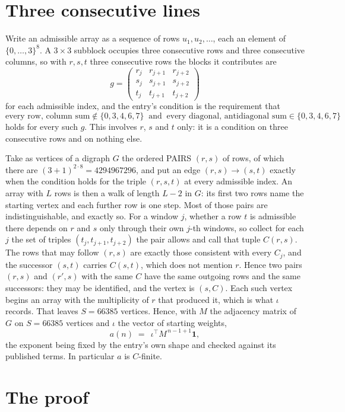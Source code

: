 \documentclass[11pt,a4paper]{article}
\theoremstyle{plain}
\theoremstyle{definition}
\begin{document}
\section{Three consecutive lines}

Write an admissible array as a sequence of rows $u_1,u_2,\dots$, each an element of
$\{0,\dots,3\}^{8}$. A $3\times3$ subblock occupies three consecutive rows and
three consecutive columns, so with $r,s,t$ three consecutive rows the blocks it
contributes are
\[
g=\begin{pmatrix}r_j&r_{j+1}&r_{j+2}\\ s_j&s_{j+1}&s_{j+2}\\ t_j&t_{j+1}&t_{j+2}\end{pmatrix}
\]
for each admissible index, and the entry's condition is the requirement that
\[
\text{every row, column sum} \notin \{0,3,4,6,7\}\ \text{ and }\ \text{every diagonal, antidiagonal sum} \in \{0,3,4,6,7\}
\]
holds for every such $g$. This involves $r$, $s$ and $t$ only: it is a condition on
three consecutive rows and on nothing else.

Take as vertices of a digraph $G$ the ordered PAIRS $(r,s)$ of rows, of which there are
$(3+1)^{2\cdot8}=4294967296$, and put an edge $(r,s)\to(s,t)$ exactly when the condition
holds for the triple $(r,s,t)$ at every admissible index. An array with $L$ rows is then a
walk of length $L-2$ in $G$: its first two rows name the starting vertex and each further
row is one step. Most of those pairs are indistinguishable, and exactly so. For a window $j$, whether a row $t$ is admissible there depends on $r$ and $s$ only through their own $j$-th windows, so collect for each $j$ the set of triples $(t_j,t_{j+1},t_{j+2})$ the pair allows and call that tuple $C(r,s)$. The rows that may follow $(r,s)$ are exactly those consistent with every $C_j$, and the successor $(s,t)$ carries $C(s,t)$, which does not mention $r$. Hence two pairs $(r,s)$ and $(r',s)$ with the same $C$ have the same outgoing rows and the same successors: they may be identified, and the vertex is $(s,C)$. Each such vertex begins an array with the multiplicity of $r$ that produced it, which is what $\iota$ records. That leaves $S=66385$ vertices. Hence, with $M$ the adjacency matrix of $G$ on $S=66385$ vertices and
$\iota$ the vector of starting weights,
\[
a(n)\;=\;\,\iota^{\!\top}M^{\,n-1+1}\mathbf{1},
\]
the exponent being fixed by the entry's own shape and checked against its published terms.
In particular $a$ is $C$-finite.

\section{The proof}
\end{document}
